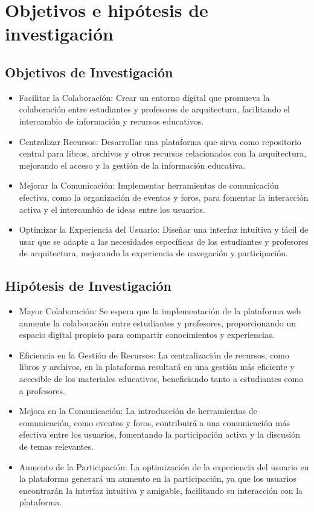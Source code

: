 \documentclass[a4paper, 12pt]{book}
\begin{document}
\section{Objetivos e hipótesis de investigación}
\label{sec:seccion}

\subsection{Objetivos de Investigación}
\label{subsec:Objetivos de Investigación}

\begin{itemize}
  \item Facilitar la Colaboración: Crear un entorno digital que promueva la colaboración entre estudiantes y profesores de arquitectura, facilitando el intercambio de información y recursos educativos.
  \item Centralizar Recursos: Desarrollar una plataforma que sirva como repositorio central para libros, archivos y otros recursos relacionados con la arquitectura, mejorando el acceso y la gestión de la información educativa.
  \item Mejorar la Comunicación: Implementar herramientas de comunicación efectiva, como la organización de eventos y foros, para fomentar la interacción activa y el intercambio de ideas entre los usuarios.
  \item Optimizar la Experiencia del Usuario: Diseñar una interfaz intuitiva y fácil de usar que se adapte a las necesidades específicas de los estudiantes y profesores de arquitectura, mejorando la experiencia de navegación y participación.
\end{itemize}

\subsection{Hipótesis de Investigación}
\label{subsec:Hipótesis de Investigación}

\begin{itemize}
  \item Mayor Colaboración: Se espera que la implementación de la plataforma web aumente la colaboración entre estudiantes y profesores, proporcionando un espacio digital propicio para compartir conocimientos y experiencias.
  \item Eficiencia en la Gestión de Recursos: La centralización de recursos, como libros y archivos, en la plataforma resultará en una gestión más eficiente y accesible de los materiales educativos, beneficiando tanto a estudiantes como a profesores.
  \item Mejora en la Comunicación: La introducción de herramientas de comunicación, como eventos y foros, contribuirá a una comunicación más efectiva entre los usuarios, fomentando la participación activa y la discusión de temas relevantes.
  \item Aumento de la Participación: La optimización de la experiencia del usuario en la plataforma generará un aumento en la participación, ya que los usuarios encontrarán la interfaz intuitiva y amigable, facilitando su interacción con la plataforma.
\end{itemize}
\end{document}
